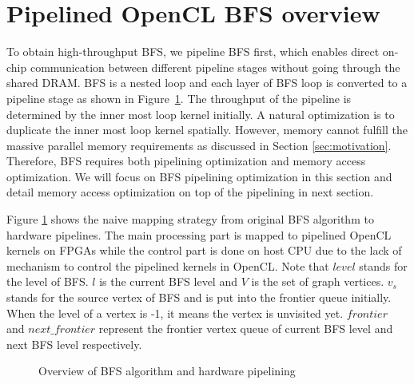 \section{Pipelined OpenCL BFS overview} \label{sec:overview}
To obtain high-throughput BFS, we pipeline BFS first, which 
enables direct on-chip communication between different 
pipeline stages without going through the shared DRAM.
BFS is a nested loop and each layer of BFS loop is 
converted to a pipeline stage as shown in Figure~\ref{fig:overview}.
The throughput of the pipeline is determined by the 
inner most loop kernel initially. A natural optimization is to duplicate the inner most 
loop kernel spatially. However, memory cannot fulfill the massive 
parallel memory requirements as discussed in Section \ref{sec:motivation}.
Therefore, BFS requires both pipelining optimization and 
memory access optimization. We will focus on BFS pipelining 
optimization in this section and detail memory access optimization 
on top of the pipelining in next section.

Figure \ref{fig:overview} shows the naive mapping strategy 
from original BFS algorithm to hardware pipelines. 
The main processing part is mapped to pipelined OpenCL kernels on FPGAs 
while the control part is done on host CPU due to the lack of 
mechanism to control the pipelined kernels in OpenCL.
Note that $level$ stands for the level of BFS. 
$l$ is the current BFS level and $V$ is the set of graph vertices. 
$v_s$ stands for the source vertex of BFS and is put into the frontier queue initially.
When the level of a vertex is -1, it means the vertex is unvisited yet.
$frontier$ and $next\_frontier$ represent the frontier vertex 
queue of current BFS level and next BFS level respectively.

\begin{figure}
    \caption{Overview of BFS algorithm and hardware pipelining}
\label{fig:overview}
\vspace{-1.2em}
\end{figure}

